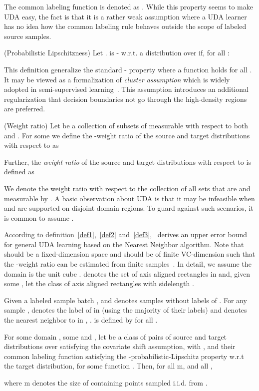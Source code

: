 \documentclass[10pt,twocolumn,letterpaper]{article}
\begin{document}
The common labeling function is denoted as . While this property seems to make UDA easy, the fact is that it is a rather weak assumption where a UDA learner has no idea how the common labeling rule behaves outside the scope of labeled source samples.
\begin{customdef}{2}
(Probabilistic Lipschitzness) Let .  is - w.r.t. a distribution  over  if, for all :

\label{def2}
\end{customdef}

This definition generalize the standard - property where a function  holds  for all . It may be viewed as a formalization of \textit{cluster assumption} which is widely adopted in semi-supervised learning~\cite{miyato2018virtual}. This assumption introduces an additional regularization that decision boundaries not go through the high-density regions are preferred.
\begin{customdef}{3}
(Weight ratio) Let  be a collection of subsets of  measurable with respect to both  and . For some  we define the -weight ratio of the source and target distributions with respect to  as

Further, the \textit{weight ratio} of the source and target distributions with respect to  is defined as

\label{def3}
\end{customdef}

We denote the weight ratio with respect to the collection of all sets that are  and  measurable by . A basic observation about UDA is that it may be infeasible when  and  are supported on disjoint domain regions. To guard against such scenarios, it is common to assume .

According to definition~\ref{def1},~\ref{def2} and~\ref{def3},~\cite{Ben-David2014} derives an upper error bound for general UDA learning based on the Nearest Neighbor algorithm. Note that  should be a fixed-dimension space and  should be of finite VC-dimension such that the -weight ratio can be estimated from finite samples~\cite{Ben-David2014}. In detail, we assume the domain is the unit cube .  denotes the set of axis aligned rectangles in  and, given some , let  the class of axis aligned rectangles with sidelength .

Given a labeled sample batch , and  denotes samples without labels of . For any sample ,  denotes the label of  in  (using the majority of their labels) and  denotes the nearest neighbor to  in , .  is defined by  for all .
\begin{customthm}{1}\label{the1}
For some domain , some  and , let  be a class of pairs  of source and target distributions over  satisfying the covariate shift assumption, with , and their common labeling function  satisfying the -probabilistic-Lipschitz property w.r.t the target distribution, for some function . Then, for all m, and all ,
 
where m denotes the size of  containing points sampled i.i.d. from .
\end{customthm}
\end{document}
